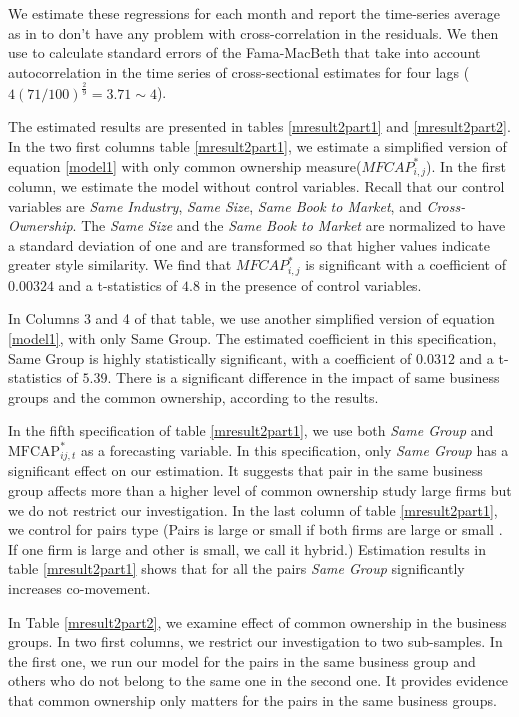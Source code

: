 	We estimate these regressions for each month and report the time-series average as in \cite{FamaMacBeth} to don't have any problem with cross-correlation in the residuals. We then use  \cite{newey1987hypothesis} to calculate standard errors of the Fama-MacBeth that take into account autocorrelation in the time series of cross-sectional estimates for four lags ($ 4(71/100)^{\frac{2}{9}} = 3.71 \sim 4 $).
	
	The estimated results are presented in tables \ref{mresult2part1}
	and \ref{mresult2part2}.
	In the two first columns table \ref{mresult2part1}, we estimate a simplified version of equation \ref{model1} with only common ownership measure($ MFCAP^*_{i,j}$). In the first column, we estimate the model without control variables. Recall that our control variables are \textit{Same Industry}, \textit{Same Size}, \textit{Same Book to Market}, and \textit{Cross-Ownership}. The \textit{Same Size} and the \textit{Same Book to Market} are normalized to have a standard deviation of one and are transformed so that higher values indicate greater style similarity.  We find that $ MFCAP^*_{i,j}$ is significant with a coefficient of $0.00324$ and a t-statistics of $4.8$ in the presence of control variables. 
	
	
	In Columns 3 and 4 of that table, we use another simplified version of equation \ref{model1}, with only Same Group. The estimated coefficient in this specification, Same Group is highly statistically significant, with a coefficient of   $0.0312$ and a t-statistics of $5.39$. 
	There is a significant difference in the impact of same business groups and the common ownership, according to the results. 
	
	In the fifth specification of table \ref{mresult2part1}, we use both \textit{Same Group}  and $\text{MFCAP}^*_{ij,t}$ as a forecasting variable. In this specification, only  \textit{Same Group} has a significant effect on our estimation. It suggests that pair in the same business group affects more than a higher level of common ownership
	\cite{AntonPolk} study large firms but we do not restrict  our investigation. In the last column of table \ref{mresult2part1}, we control for pairs type (Pairs is large or small if both firms are large or  small . If one firm is large and other is small, we call it hybrid.) Estimation results in table \ref{mresult2part1} shows that for all the pairs \textit{Same Group} significantly increases co-movement.
	
	In Table  \ref{mresult2part2}, we examine effect of common ownership in the business groups. In two first columns, we restrict our investigation to two sub-samples. In the first one, we run our model for the pairs in the same business group and others who do not belong to the same one in the second one. It provides evidence that common ownership only matters for the pairs in the same business groups. 
	
